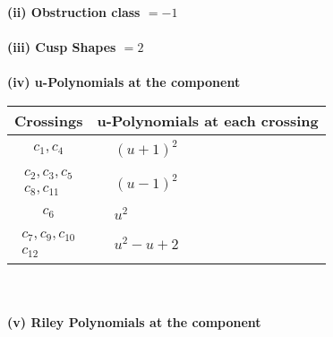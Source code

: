 \documentclass[1p]{elsarticle_modified}
\theoremstyle{definition}
\begin{document}
\flushleft \textbf{(ii) Obstruction class $= -1$}\\~\\
\flushleft \textbf{(iii) Cusp Shapes $= 2$}\\~\\
\newpage\renewcommand{\arraystretch}{1}
\flushleft \textbf{(iv) u-Polynomials at the component}\newline \\
\begin{tabular}{m{50pt}|m{274pt}}
Crossings & \hspace{64pt}u-Polynomials at each crossing \\
\hline $$\begin{aligned}c_{1},c_{4}\end{aligned}$$&$\begin{aligned}
&(u+1)^2
\end{aligned}$\\
\hline $$\begin{aligned}c_{2},c_{3},c_{5}\\c_{8},c_{11}\end{aligned}$$&$\begin{aligned}
&(u-1)^2
\end{aligned}$\\
\hline $$\begin{aligned}c_{6}\end{aligned}$$&$\begin{aligned}
&u^2
\end{aligned}$\\
\hline $$\begin{aligned}c_{7},c_{9},c_{10}\\c_{12}\end{aligned}$$&$\begin{aligned}
&u^2- u+2
\end{aligned}$\\
\hline
\end{tabular}\\~\\
\newpage\renewcommand{\arraystretch}{1}
\flushleft \textbf{(v) Riley Polynomials at the component}\newline \\
\end{document}
